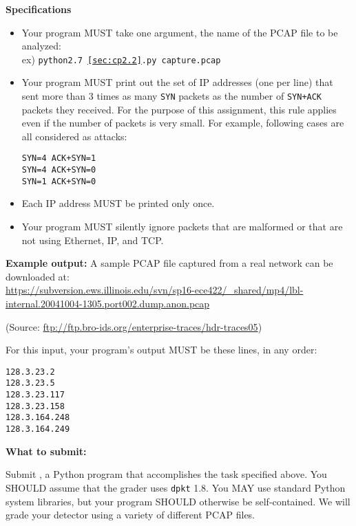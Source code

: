 \textbf{Specifications}
\begin{itemize}
  \item Your program MUST take one argument, the name of the PCAP file to be analyzed:\\
    ex) \texttt{python2.7 \ref{sec:cp2.2}.py capture.pcap}
  \item Your program MUST print out the set of IP addresses (one per line) that sent more than 3 times as many \texttt{SYN} packets as the number of \texttt{SYN+ACK} packets they received.
  For the purpose of this assignment, this rule applies even if the number of packets is very small.
  For example, following cases are all considered as attacks:
\begin{mdframed}
\begin{verbatim}
SYN=4 ACK+SYN=1
SYN=4 ACK+SYN=0
SYN=1 ACK+SYN=0
\end{verbatim}
\end{mdframed}
  \item Each IP address MUST be printed only once.
  \item Your program MUST silently ignore packets that are malformed or that are not using Ethernet, IP, and TCP.
\end{itemize}

\pagebreak

\textbf{Example output:}
A sample PCAP file captured from a real network can be downloaded at:\\
\url{https://subversion.ews.illinois.edu/svn/sp16-ece422/\_shared/mp4/lbl-internal.20041004-1305.port002.dump.anon.pcap}

\begingroup\raggedleft
(Source: \url{ftp://ftp.bro-ids.org/enterprise-traces/hdr-traces05})\\
\endgroup

For this input, your program's output MUST be these lines, in any order:
\vspace{-6pt}
\begin{mdframed}
\begin{verbatim}
128.3.23.2
128.3.23.5
128.3.23.117
128.3.23.158
128.3.164.248
128.3.164.249
\end{verbatim}
\end{mdframed}

\smallskip

\hypertarget{cp2anomaly}{\textbf{What to submit:}} Submit
  \texttt{\fileanomaly}, a Python program that accomplishes the task specified above.
You SHOULD assume that the grader uses \texttt{dpkt} 1.8.
You MAY use standard Python system libraries, but your program SHOULD otherwise be self-contained.
We will grade your detector using a variety of different PCAP files.

